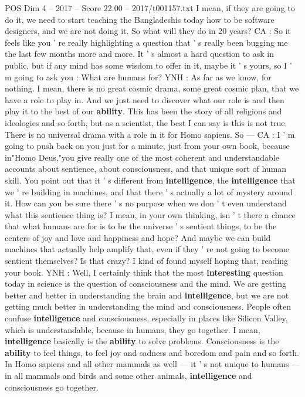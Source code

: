 \begin{textsample}{POS Dim 4 – 2017 – Score 22.00 – 2017/t001157.txt}
I mean, if they are going to do it, we need to start teaching the Bangladeshis today how to be software designers, and we are not doing it.
So what will they do in 20 years?
CA : So it feels like you ' re really highlighting a question that ' s really been bugging me the last few months more and more.
It ' s almost a hard question to ask in public, but if any mind has some wisdom to offer in it, maybe it ' s yours, so I ' m going to ask you : What are humans for?
YNH : As far as we know, for nothing.
I mean, there is no great cosmic drama, some great cosmic plan, that we have a role to play in.
And we just need to discover what our role is and then play it to the best of our \textbf{ability}.
This has been the story of all religions and ideologies and so forth, but as a scientist, the best I can say is this is not true.
There is no universal drama with a role in it for Homo sapiens.
So — CA : I ' m going to push back on you just for a minute, just from your own book, because in"Homo Deus,"you give really one of the most coherent and understandable accounts about sentience, about consciousness, and that unique sort of human skill.
You point out that it ' s different from \textbf{intelligence}, the \textbf{intelligence} that we ' re building in machines, and that there ' s actually a lot of mystery around it.
How can you be sure there ' s no purpose when we don ' t even understand what this sentience thing is?
I mean, in your own thinking, isn ' t there a chance that what humans are for is to be the universe ' s sentient things, to be the centers of joy and love and happiness and hope?
And maybe we can build machines that actually help amplify that, even if they ' re not going to become sentient themselves?
Is that crazy?
I kind of found myself hoping that, reading your book.
YNH : Well, I certainly think that the most \textbf{interesting} question today in science is the question of consciousness and the mind.
We are getting better and better in understanding the brain and \textbf{intelligence}, but we are not getting much better in understanding the mind and consciousness.
People often confuse \textbf{intelligence} and consciousness, especially in places like Silicon Valley, which is understandable, because in humans, they go together.
I mean, \textbf{intelligence} basically is the \textbf{ability} to solve problems.
Consciousness is the \textbf{ability} to feel things, to feel joy and sadness and boredom and pain and so forth.
In Homo sapiens and all other mammals as well — it ' s not unique to humans — in all mammals and birds and some other animals, \textbf{intelligence} and consciousness go together.

\end{textsample}
